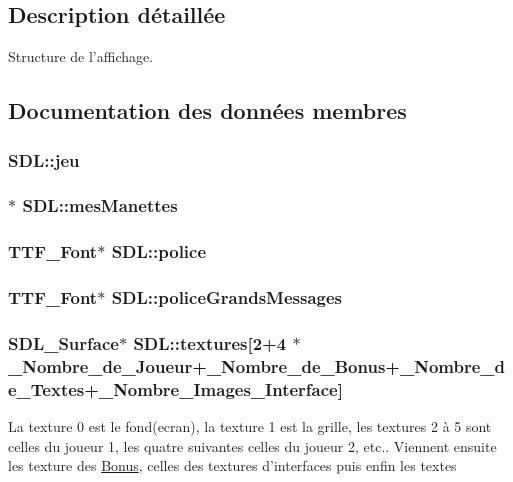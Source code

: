 \subsection{Description détaillée}
Structure de l'affichage. 

\subsection{Documentation des données membres}
\hypertarget{structSDL_aed6e34a843f7e278abbc6401e7a86748}{
\subsubsection[{jeu}]{ S\-D\-L\-::jeu}}\label{structSDL_aed6e34a843f7e278abbc6401e7a86748}
\hypertarget{structSDL_ace23bf8418b8f58e086b6e608e9d0ba0}{
\subsubsection[{mes\-Manettes}]{$\ast$ S\-D\-L\-::mes\-Manettes}}\label{structSDL_ace23bf8418b8f58e086b6e608e9d0ba0}
\hypertarget{structSDL_a1ad36295e29f111c716ccdb0e7265a4e}{
\subsubsection[{police}]{\setlength{\rightskip}{0pt plus 5cm}T\-T\-F\-\_\-\-Font$\ast$ S\-D\-L\-::police}}\label{structSDL_a1ad36295e29f111c716ccdb0e7265a4e}
\hypertarget{structSDL_a6b8f503288d42f8dbe8bb3ff97629404}{
\subsubsection[{police\-Grands\-Messages}]{\setlength{\rightskip}{0pt plus 5cm}T\-T\-F\-\_\-\-Font$\ast$ S\-D\-L\-::police\-Grands\-Messages}}\label{structSDL_a6b8f503288d42f8dbe8bb3ff97629404}
\hypertarget{structSDL_a7a8c5288d76cf72d0f5ba90ef4046d58}{
\subsubsection[{textures}]{\setlength{\rightskip}{0pt plus 5cm}S\-D\-L\-\_\-\-Surface$\ast$ S\-D\-L\-::textures\mbox{[}2+4 $\ast${\bf \-\_\-\-Nombre\-\_\-de\-\_\-\-Joueur}+{\bf \-\_\-\-Nombre\-\_\-de\-\_\-\-Bonus}+{\bf \-\_\-\-Nombre\-\_\-de\-\_\-\-Textes}+{\bf \-\_\-\-Nombre\-\_\-\-Images\-\_\-\-Interface}\mbox{]}}}\label{structSDL_a7a8c5288d76cf72d0f5ba90ef4046d58}
La texture 0 est le fond(ecran), la texture 1 est la grille, les textures 2 à 5 sont celles du joueur 1, les quatre suivantes celles du joueur 2, etc.. Viennent ensuite les texture des \hyperlink{structBonus}{Bonus}, celles des textures d'interfaces puis enfin les textes 


